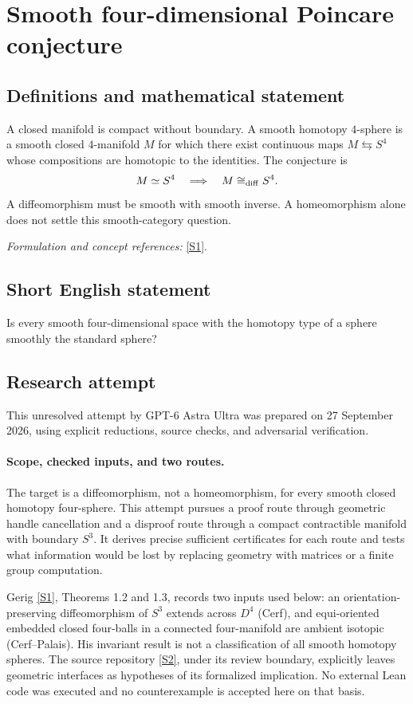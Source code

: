 \documentclass[11pt]{article}
\begin{document}
\section*{\texorpdfstring{Smooth four-dimensional Poincare conjecture}{Smooth four-dimensional Poincare conjecture}}\label{22}
\subsection{Definitions and mathematical statement}
A closed manifold is compact without boundary. A smooth homotopy $4$-sphere is a smooth closed $4$-manifold $M$ for which there exist continuous maps $M\leftrightarrows S^4$ whose compositions are homotopic to the identities. The conjecture is
\[
 M\simeq S^4\quad\Longrightarrow\quad M\cong_{\rm diff} S^4.
\]
A diffeomorphism must be smooth with smooth inverse. A homeomorphism alone does not settle this smooth-category question.
\par\smallskip\textit{Formulation and concept references:} \href{https://arxiv.org/pdf/1905.10938}{[S1]}.

\subsection{Short English statement}
Is every smooth four-dimensional space with the homotopy type of a sphere smoothly the standard sphere?
\subsection{Research attempt}
This unresolved attempt by GPT-6 Astra Ultra was prepared on 27 September
2026, using explicit reductions, source checks, and adversarial verification.

\paragraph{Scope, checked inputs, and two routes.}
The target is a diffeomorphism, not a homeomorphism, for every smooth
closed homotopy four-sphere. This attempt pursues a proof route through
geometric handle cancellation and a disproof route through a compact
contractible manifold with boundary $S^3$. It derives precise sufficient
certificates for each route and tests what information would be lost by
replacing geometry with matrices or a finite group computation.

Gerig \href{https://arxiv.org/pdf/1905.10938}{[S1]}, Theorems 1.2 and 1.3, records two inputs used below: an
orientation-preserving diffeomorphism of $S^3$ extends across $D^4$
(Cerf), and equi-oriented embedded closed four-balls in a connected
four-manifold are ambient isotopic (Cerf--Palais). His invariant result
is not a classification of all smooth homotopy spheres. The source
repository \href{https://github.com/toffee-desuwa/smooth4pc-t73-lean/blob/main/docs/INDEPENDENT_REVIEW.md}{[S2]}, under its review boundary, explicitly leaves geometric
interfaces as hypotheses of its formalized implication. No external Lean
code was executed and no counterexample is accepted here on that basis.
\end{document}
